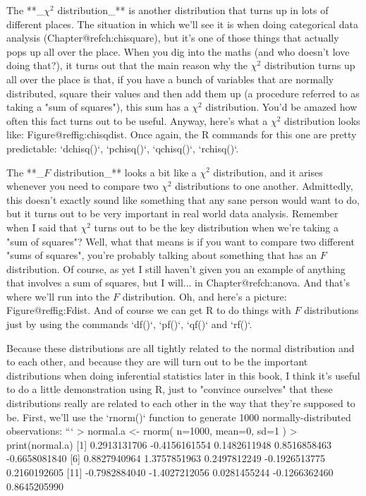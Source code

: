 \item The **_$\chi^2$ distribution_** is another distribution that turns up in lots of different places. The situation in which we'll see it is when doing categorical data analysis (Chapter@refch:chisquare), but it's one of those things that actually pops up all over the place. When you dig into the maths (and who doesn't love doing that?), it turns out that the main reason why the $\chi^2$ distribution turns up all over the place is that, if you have a bunch of variables that are normally distributed, square their values and then add them up (a procedure referred to as taking a "sum of squares"), this sum has a $\chi^2$ distribution. You'd be amazed how often this fact turns out to be useful. Anyway, here's what a $\chi^2$ distribution looks like: Figure@reffig:chisqdist.  Once again, the R commands for this one are pretty predictable: `dchisq()`,  `pchisq()`,  `qchisq()`, `rchisq()`.

\item The **_$F$ distribution_** looks a bit like a $\chi^2$ distribution, and it arises whenever you need to compare two $\chi^2$ distributions to one another. Admittedly, this doesn't exactly sound like something that any sane person would want to do, but it turns out to be very important in real world data analysis. Remember when I said that $\chi^2$ turns out to be the key distribution when we're taking a "sum of squares"? Well, what that means is if you want to compare two different "sums of squares", you're probably talking about something that has an $F$ distribution. Of course, as yet I still haven't given you an example of anything that involves a sum of squares, but I will... in Chapter@refch:anova. And that's where we'll run into the $F$ distribution. Oh, and here's a picture: Figure@reffig:Fdist. And of course we can get R to do things with $F$ distributions just by using the commands `df()`, `pf()`, `qf()` and `rf()`.



Because these distributions are all tightly related to the normal distribution and to each other, and because they are will turn out to be the important distributions when doing inferential statistics later in this book, I think it's useful to do a little demonstration using R, just to "convince ourselves" that these distributions really are related to each other in the way that they're supposed to be. First, we'll use the `rnorm()` function to generate 1000 normally-distributed observations: 
```
> normal.a <- rnorm( n=1000, mean=0, sd=1 )  
> print(normal.a)
   [1]  0.2913131706 -0.4156161554  0.1482611948  0.8516858463 -0.6658081840
   [6]  0.8827940964  1.3757851963  0.2497812249 -0.1926513775  0.2160192605
  [11] -0.7982884040 -1.4027212056  0.0281455244 -0.1266362460  0.8645205990


